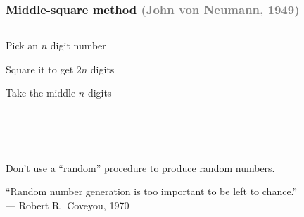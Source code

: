 \documentclass[14pt,aspectratio=169]{beamer}
\begin{document}
\begin{frame}
  \frametitle{Middle-square method \hfill\textcolor{gray}{(John von Neumann, 1949)}}

  \begin{columns}
    \begin{column}{0.4\textwidth}
      \alert<2,5,8>{Pick an $n$ digit number}

      \alert<3,6,9>{Square it to get $2n$ digits}

      \alert<4,7,10>{Take the middle $n$ digits}
    \end{column}
    \begin{column}{0.6\textwidth}
       \\
      \quad{} \\
      \quad{}

       \\
      \quad{} \\
      \quad{}

       \\
      \quad{} \\
      \quad{}
    \end{column}
  \end{columns}

  \vfill

   \uncover<5->{904119,}     

\end{frame}

\begin{frame}

  Don't use a ``random'' procedure to produce random numbers.

  \vfill\pause

  ``Random number generation is too important to be left to chance.'' \\
  \hfill --- Robert R.~Coveyou, 1970

\end{frame}
\end{document}

